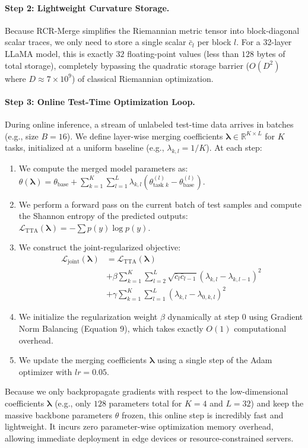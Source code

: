\paragraph{Step 2: Lightweight Curvature Storage.}
Because RCR-Merge simplifies the Riemannian metric tensor into block-diagonal scalar traces, we only need to store a single scalar $\bar{c}_l$ per block $l$. For a 32-layer LLaMA model, this is exactly $32$ floating-point values (less than $128$ bytes of total storage), completely bypassing the quadratic storage barrier ($O(D^2)$ where $D \approx 7 \times 10^9$) of classical Riemannian optimization.

\paragraph{Step 3: Online Test-Time Optimization Loop.}
During online inference, a stream of unlabeled test-time data arrives in batches (e.g., size $B = 16$). We define layer-wise merging coefficients $\boldsymbol{\lambda} \in \mathbb{R}^{K \times L}$ for $K$ tasks, initialized at a uniform baseline (e.g., $\lambda_{k, l} = 1/K$). At each step:
\begin{enumerate}
    \item We compute the merged model parameters as: $\theta(\boldsymbol{\lambda}) = \theta_{\text{base}} + \sum_{k=1}^K \sum_{l=1}^L \lambda_{k, l} (\theta_{\text{task } k}^{(l)} - \theta_{\text{base}}^{(l)})$.
    \item We perform a forward pass on the current batch of test samples and compute the Shannon entropy of the predicted outputs: $\mathcal{L}_{\text{TTA}}(\boldsymbol{\lambda}) = -\sum p(y)\log p(y)$.
    \item We construct the joint-regularized objective:
    \begin{align}
    \mathcal{L}_{\text{joint}}(\boldsymbol{\lambda}) &= \mathcal{L}_{\text{TTA}}(\boldsymbol{\lambda}) \nonumber \\
    &+ \beta \sum_{k=1}^K \sum_{l=2}^L \sqrt{\bar{c}_l \bar{c}_{l-1}} (\lambda_{k, l} - \lambda_{k, l-1})^2 \nonumber \\
    &+ \gamma \sum_{k=1}^K \sum_{l=1}^L (\lambda_{k, l} - \lambda_{0, k, l})^2
    \end{align}
    \item We initialize the regularization weight $\beta$ dynamically at step 0 using Gradient Norm Balancing (Equation 9), which takes exactly $O(1)$ computational overhead.
    \item We update the merging coefficients $\boldsymbol{\lambda}$ using a single step of the Adam optimizer with $lr = 0.05$.
\end{enumerate}
Because we only backpropagate gradients with respect to the low-dimensional coefficients $\boldsymbol{\lambda}$ (e.g., only $128$ parameters total for $K=4$ and $L=32$) and keep the massive backbone parameters $\theta$ frozen, this online step is incredibly fast and lightweight. It incurs zero parameter-wise optimization memory overhead, allowing immediate deployment in edge devices or resource-constrained servers.

